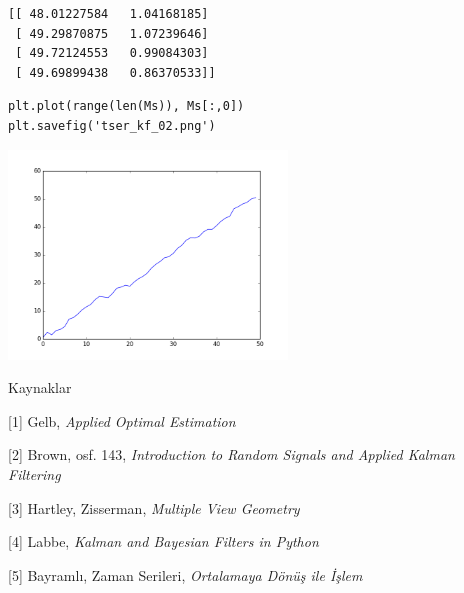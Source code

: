 \documentclass[12pt,fleqn]{article}\usepackage{../../common}
\begin{document}
\begin{verbatim}
[[ 48.01227584   1.04168185]
 [ 49.29870875   1.07239646]
 [ 49.72124553   0.99084303]
 [ 49.69899438   0.86370533]]
\end{verbatim}

\begin{verbatim}
plt.plot(range(len(Ms)), Ms[:,0])
plt.savefig('tser_kf_02.png')
\end{verbatim}

\includegraphics[width=20em]{tser_kf_02.png}

Kaynaklar

[1] Gelb, {\em Applied Optimal Estimation}

[2] Brown, osf. 143, {\em Introduction to Random Signals and Applied Kalman Filtering}

[3] Hartley, Zisserman, {\em Multiple View Geometry} 

[4] Labbe, {\em Kalman and Bayesian Filters in Python}

[5] Bayramlı, Zaman Serileri, {\em Ortalamaya Dönüş ile İşlem}
\end{document}
